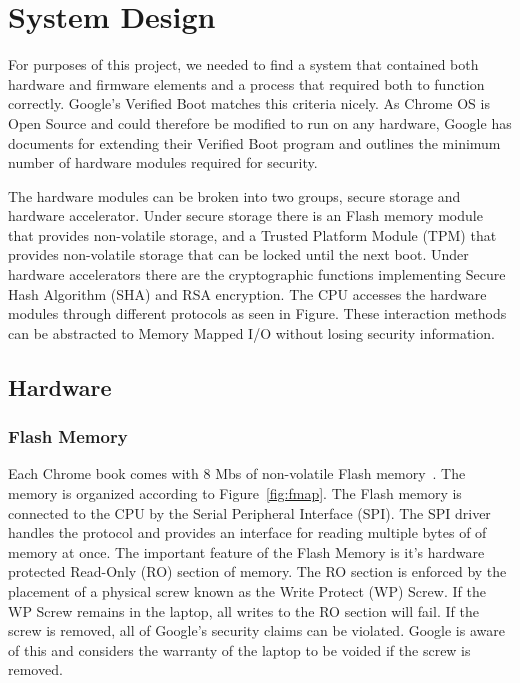 \documentclass[../report.tex]{subfiles}
\begin{document}
\onehalfspacing

\section{System Design}

For purposes of this project, we needed to find a system that contained both hardware and firmware elements and a process that required both to function correctly.
Google's Verified Boot matches this criteria nicely. 
As Chrome OS is Open Source and could therefore be modified to run on any hardware,
Google has documents for extending their Verified Boot program and outlines the minimum
number of hardware modules required for security.

The hardware modules can be broken into two groups, secure storage and hardware accelerator.
Under secure storage there is an Flash memory module that provides non-volatile storage, and a Trusted Platform Module (TPM) that provides non-volatile storage that can be locked until the next boot.
Under hardware accelerators there are the cryptographic functions implementing Secure Hash Algorithm (SHA) and RSA encryption. 
The CPU accesses the hardware modules through different protocols as seen in Figure. %
These interaction methods can be abstracted to Memory Mapped I/O without losing security information.

\subsection{Hardware}

\subsubsection{Flash Memory}

Each Chrome book comes with 8 Mbs of non-volatile Flash memory~\cite{fw-summit}.
The memory is organized according to Figure~\ref{fig:fmap}. 
The Flash memory is connected to the CPU by the Serial Peripheral Interface (SPI).
The SPI driver handles the protocol and provides an interface for reading multiple bytes of of memory at once.
The important feature of the Flash Memory is it's hardware protected Read-Only (RO) section of memory.
The RO section is enforced by the placement of a physical screw known as the Write Protect (WP) Screw.
If the WP Screw remains in the laptop, all writes to the RO section will fail.
If the screw is removed, all of Google's security claims can be violated. 
Google is aware of this and considers the warranty of the laptop to be voided if the screw is removed.
\end{document}
